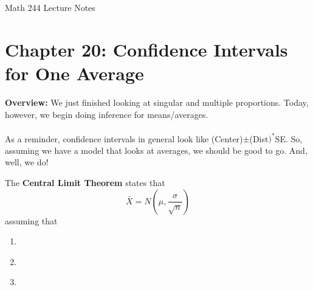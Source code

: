 \documentclass[12pt]{amsart}
\date{}
\theoremstyle{definition}
\begin{document}
\newcommand{\ph}{\phantom}
\newcommand{\ds}{\displaystyle}

\renewcommand{\emph}{\textbf}
\onehalfspace


\fancyhf{}   %
\renewcommand{\headrulewidth}{0.4pt} %
\fancyfootoffset[LE,LO]{0in}        %
\renewcommand{\footrulewidth}{0.4pt} %




\begin{center}

	\larger[3]	Math 244 Lecture Notes \smaller[3]		\\[22pt]

\end{center}

\section*{Chapter 20: Confidence Intervals for One Average}




 \textbf{Overview:} We just finished looking at singular and multiple proportions. Today, however, we begin doing inference for means/averages.\\
 ~\\
 As a reminder, confidence intervals in general look like (Center)$\pm$(Dist$)^*$SE. So, assuming we have a model that looks at averages, we should be good to go. And, well, we do!
 
 \begin{framed}
 The \emph{Central Limit Theorem} states that $$\bar{X}=N\left(\mu,\frac{\sigma}{\sqrt{n}}\right)$$ assuming that
 \begin{enumerate}
  \item \,
  \item \,
  \item \,
 \end{enumerate}

 \end{framed}
\end{document}
